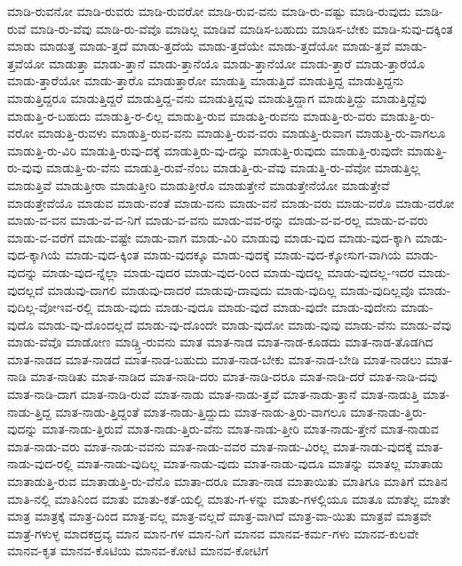 {ಮಾಡಿ-ರುವನೋ
ಮಾಡಿ-ರುವರು
ಮಾಡಿ-ರುವರೋ
ಮಾಡಿ-ರುವ-ವನು
ಮಾಡಿ-ರು-ವಷ್ಟು
ಮಾಡಿ-ರುವುದು
ಮಾಡಿ-ರುವೆ
ಮಾಡಿ-ರು-ವೆವು
ಮಾಡಿ-ರು-ವೆವೊ
ಮಾಡಿಲ್ಲ
ಮಾಡಿವೆ
ಮಾಡಿಸ-ಬಹುದು
ಮಾಡಿಸ-ಬೇಕು
ಮಾಡಿ-ಸುವು-ದಕ್ಕಿಂತ
ಮಾಡು
ಮಾಡುತ್ತ
ಮಾಡು-ತ್ತದೆ
ಮಾಡು-ತ್ತದೆಯೆ
ಮಾಡು-ತ್ತದೆಯೇ
ಮಾಡು-ತ್ತದೆಯೋ
ಮಾಡು-ತ್ತವೆ
ಮಾಡು-ತ್ತವೆಯೋ
ಮಾಡುತ್ತಾ
ಮಾಡು-ತ್ತಾನೆ
ಮಾಡು-ತ್ತಾನೆಯೊ
ಮಾಡು-ತ್ತಾನೆಯೋ
ಮಾಡು-ತ್ತಾರೆ
ಮಾಡು-ತ್ತಾರೆಯೊ
ಮಾಡು-ತ್ತಾರೆಯೋ
ಮಾಡು-ತ್ತಾರೊ
ಮಾಡುತ್ತಾರೋ
ಮಾಡುತ್ತಿ
ಮಾಡುತ್ತಿದೆ
ಮಾಡುತ್ತಿದ್ದ
ಮಾಡುತ್ತಿದ್ದನು
ಮಾಡುತ್ತಿದ್ದರೂ
ಮಾಡುತ್ತಿದ್ದರೆ
ಮಾಡುತ್ತಿದ್ದ-ವನು
ಮಾಡುತ್ತಿದ್ದವು
ಮಾಡುತ್ತಿದ್ದಾಗ
ಮಾಡುತ್ತಿದ್ದು
ಮಾಡುತ್ತಿದ್ದೆವು
ಮಾಡುತ್ತಿ-ರ-ಬಹುದು
ಮಾಡುತ್ತಿ-ರ-ಲಿಲ್ಲ
ಮಾಡುತ್ತಿ-ರುವ
ಮಾಡುತ್ತಿ-ರುವನು
ಮಾಡುತ್ತಿ-ರು-ವರು
ಮಾಡುತ್ತಿ-ರು-ವರೋ
ಮಾಡುತ್ತಿ-ರುವಳು
ಮಾಡುತ್ತಿ-ರುವ-ವನು
ಮಾಡುತ್ತಿ-ರುವ-ವರು
ಮಾಡುತ್ತಿ-ರುವಾಗ
ಮಾಡುತ್ತಿ-ರು-ವಾಗಲೂ
ಮಾಡುತ್ತಿ-ರು-ವಿರಿ
ಮಾಡುತ್ತಿ-ರುವು-ದಕ್ಕೆ
ಮಾಡುತ್ತಿರು-ವು-ದನ್ನು
ಮಾಡುತ್ತಿ-ರುವುದು
ಮಾಡುತ್ತಿ-ರುವುದೇ
ಮಾಡುತ್ತಿ-ರು-ವುವು
ಮಾಡುತ್ತಿ-ರು-ವೆನು
ಮಾಡುತ್ತಿ-ರುವೆ-ನೆಂಬ
ಮಾಡುತ್ತಿ-ರು-ವೆವು
ಮಾಡುತ್ತಿ-ರು-ವೆವೋ
ಮಾಡುತ್ತಿಲ್ಲ
ಮಾಡುತ್ತಿವೆ
ಮಾಡುತ್ತೀರಾ
ಮಾಡುತ್ತೀರಿ
ಮಾಡುತ್ತೀರೊ
ಮಾಡುತ್ತೇನೆ
ಮಾಡುತ್ತೇನೆಯೋ
ಮಾಡುತ್ತೇವೆ
ಮಾಡುತ್ತೇವೆಯೊ
ಮಾಡುವ
ಮಾಡು-ವಂತೆ
ಮಾಡು-ವನು
ಮಾಡು-ವನೆ
ಮಾಡು-ವರು
ಮಾಡು-ವರೊ
ಮಾಡು-ವರೋ
ಮಾಡು-ವ-ವನ
ಮಾಡು-ವ-ವ-ನಿಗೆ
ಮಾಡು-ವ-ವನು
ಮಾಡು-ವವ-ರನ್ನು
ಮಾಡು-ವ-ವ-ರಲ್ಲ
ಮಾಡು-ವ-ವರು
ಮಾಡು-ವ-ವರೆಗೆ
ಮಾಡು-ವಷ್ಟೇ
ಮಾಡು-ವಾಗ
ಮಾಡು-ವಿರಿ
ಮಾಡುವು
ಮಾಡು-ವುದ
ಮಾಡು-ವುದ-ಕ್ಕಾಗಿ
ಮಾಡು-ವುದ-ಕ್ಕಾಗಿಯೆ
ಮಾಡು-ವುದ-ಕ್ಕಿಂತ
ಮಾಡು-ವುದಕ್ಕೂ
ಮಾಡು-ವುದಕ್ಕೆ
ಮಾಡು-ವುದ-ಕ್ಕೋಸುಗ-ವಾಗಿಯೆ
ಮಾಡು-ವುದನ್ನು
ಮಾಡು-ವುದ-ನ್ನೆಲ್ಲಾ
ಮಾಡು-ವುದರ
ಮಾಡು-ವುದ-ರಿಂದ
ಮಾಡು-ವುದಲ್ಲ
ಮಾಡು-ವುದಲ್ಲ-ಇದರ
ಮಾಡು-ವುದಲ್ಲದೆ
ಮಾಡುವು-ದಾಗಲಿ
ಮಾಡುವು-ದಾದರೆ
ಮಾಡುವು-ದಾವುದು
ಮಾಡು-ವುದಿಲ್ಲ
ಮಾಡು-ವುದಿಲ್ಲವೊ
ಮಾಡು-ವುದಿಲ್ಲ-ವೋಇವ-ರಲ್ಲಿ
ಮಾಡು-ವುದು
ಮಾಡು-ವುದೂ
ಮಾಡು-ವುದೆ
ಮಾಡು-ವುದೇ
ಮಾಡು-ವುದೇನು
ಮಾಡು-ವುದೊ
ಮಾಡು-ವು-ದೊಂದಲ್ಲದೆ
ಮಾಡು-ವು-ದೊಂದೇ
ಮಾಡು-ವುದೋ
ಮಾಡು-ವುವು
ಮಾಡು-ವೆನು
ಮಾಡು-ವೆವು
ಮಾಡು-ವೆವೊ
ಮಾಡೋಣ
ಮಾಡ್ಡ್ತಿ-ರುವನು
ಮಾತ
ಮಾತ-ನಾಡ
ಮಾತ-ನಾಡ-ಕೂಡದು
ಮಾತ-ನಾಡ-ತೊಡಗಿದ
ಮಾತ-ನಾಡದ
ಮಾತ-ನಾಡದೆ
ಮಾತ-ನಾಡ-ಬಹುದು
ಮಾತ-ನಾಡ-ಬೇಕು
ಮಾತ-ನಾಡ-ಬೇಡಿ
ಮಾತ-ನಾಡಲು
ಮಾತ-ನಾಡಿ
ಮಾತ-ನಾಡಿತು
ಮಾತ-ನಾಡಿದ
ಮಾತ-ನಾಡಿ-ದರು
ಮಾತ-ನಾಡಿ-ದರೂ
ಮಾತ-ನಾಡಿ-ದರೆ
ಮಾತ-ನಾಡಿ-ದವು
ಮಾತ-ನಾಡಿ-ದಾಗ
ಮಾತ-ನಾಡಿ-ರುವೆ
ಮಾತ-ನಾಡು
ಮಾತ-ನಾಡು-ತ್ತವೆ
ಮಾತ-ನಾಡು-ತ್ತಾನೆ
ಮಾತ-ನಾಡುತ್ತಿ
ಮಾತ-ನಾಡು-ತ್ತಿದ್ದ
ಮಾತ-ನಾಡು-ತ್ತಿದ್ದಂತೆ
ಮಾತ-ನಾಡು-ತ್ತಿದ್ದುದು
ಮಾತ-ನಾಡು-ತ್ತಿರು-ವಾಗಲೂ
ಮಾತ-ನಾಡು-ತ್ತಿರು-ವುದನ್ನು
ಮಾತ-ನಾಡು-ತ್ತಿರುವೆ
ಮಾತ-ನಾಡು-ತ್ತಿರು-ವೆನು
ಮಾತ-ನಾಡು-ತ್ತೀರಿ
ಮಾತ-ನಾಡು-ತ್ತೇನೆ
ಮಾತ-ನಾಡುವ
ಮಾತ-ನಾಡು-ವರು
ಮಾತ-ನಾಡು-ವವನು
ಮಾತ-ನಾಡು-ವವರ
ಮಾತ-ನಾಡು-ವಿರಲ್ಲ
ಮಾತ-ನಾಡು-ವುದಕ್ಕೆ
ಮಾತ-ನಾಡು-ವುದ-ರಲ್ಲಿ
ಮಾತ-ನಾಡು-ವುದಿಲ್ಲ
ಮಾತ-ನಾಡು-ವುದು
ಮಾತ-ನಾಡು-ವುದೂ
ಮಾತನ್ನು
ಮಾತಲ್ಲ
ಮಾತಾಡು
ಮಾತಾಡುತ್ತಿ-ರುವ
ಮಾತಾಡುತ್ತಿ-ರು-ವೆನೊ
ಮಾತಾ-ದರೂ
ಮಾತಾ-ನಾಡ
ಮಾತಾಯಿತು
ಮಾತಿಗೂ
ಮಾತಿಗೆ
ಮಾತಿನ
ಮಾತಿ-ನಲ್ಲಿ
ಮಾತಿನಿಂದ
ಮಾತು
ಮಾತು-ಕತೆ-ಯಲ್ಲಿ
ಮಾತು-ಗ-ಳನ್ನು
ಮಾತು-ಗಳಲ್ಲಿಯೂ
ಮಾತೂ
ಮಾತೆಲ್ಲ
ಮಾತೇ
ಮಾತ್ರ
ಮಾತ್ರಕ್ಕೆ
ಮಾತ್ರ-ದಿಂದ
ಮಾತ್ರ-ವಲ್ಲ
ಮಾತ್ರ-ವಲ್ಲದೆ
ಮಾತ್ರ-ವಾಗಿದೆ
ಮಾತ್ರ-ವಾ-ಯಿತು
ಮಾತ್ರವೆ
ಮಾತ್ರವೇ
ಮಾತ್ರೆ-ಗಳುಳ್ಳ
ಮಾದಕದ್ರವ್ಯ
ಮಾನ
ಮಾನ-ಗಳ
ಮಾನ-ನಿಗೆ
ಮಾನವ
ಮಾನವ-ಕರ್ಮ-ಗಳು
ಮಾನವ-ಕುಲವೇ
ಮಾನವ-ಕೃತ
ಮಾನವ-ಕೊಟಿಯ
ಮಾನವ-ಕೋಟಿ
ಮಾನವ-ಕೋಟಿಗೆ
}
